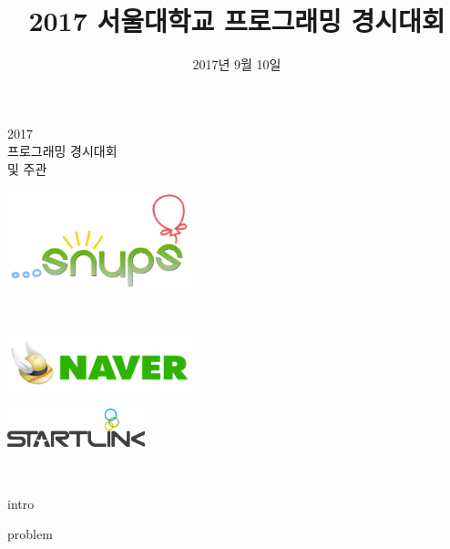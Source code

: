 \documentclass[11pt,a4paper,oneside,final]{article}
\title{2017 서울대학교 프로그래밍 경시대회}
\date{2017년 9월 10일}
\begin{document}
\begin{titlepage}
\begin{center}

\vspace*{3cm}

\textsc{\Huge2017}\\[0.5cm]
\textsc{ 프로그래밍 경시대회}\\[2cm]

\vspace{2cm}
\textsc{ 및 주관}\\[0.0cm]

\begin{center}
\includegraphics[width=0.4\textwidth]{snups.png}
\end{center}

\vspace{1cm}
\textsc{}\\[0.0cm]

\begin{center}
\includegraphics[width=0.4\textwidth]{naver.jpg}
\end{center}

\begin{center}
\includegraphics[width=0.3\textwidth]{startlink.png}
\end{center}

\vspace{1cm}
\textsc{\Large \THEDATE}\\[0.5cm]

\vspace*{\fill}

\end{center}
\end{titlepage}

{intro}

{problem}
\end{document}
